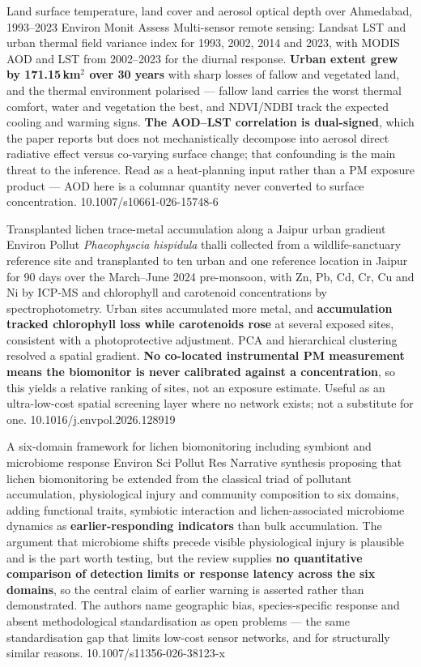 \documentclass[10pt]{article}
\begin{document}
{Land surface temperature, land cover and aerosol optical depth over Ahmedabad, 1993--2023}
{Environ Monit Assess}
{Multi-sensor remote sensing: Landsat LST and urban thermal field variance index for 1993,
2002, 2014 and 2023, with MODIS AOD and LST from 2002--2023 for the diurnal response.
\textbf{Urban extent grew by 171.15\,km$^2$ over 30 years} with sharp losses of fallow and
vegetated land, and the thermal environment polarised --- fallow land carries the worst
thermal comfort, water and vegetation the best, and NDVI/NDBI track the expected cooling
and warming signs. \textbf{The AOD--LST correlation is dual-signed}, which the paper
reports but does not mechanistically decompose into aerosol direct radiative effect versus
co-varying surface change; that confounding is the main threat to the inference. Read as
a heat-planning input rather than a PM exposure product --- AOD here is a columnar
quantity never converted to surface concentration.}
{10.1007/s10661-026-15748-6}

{Transplanted lichen trace-metal accumulation along a Jaipur urban gradient}
{Environ Pollut}
{\textit{Phaeophyscia hispidula} thalli collected from a wildlife-sanctuary reference site
and transplanted to ten urban and one reference location in Jaipur for 90 days over the
March--June 2024 pre-monsoon, with Zn, Pb, Cd, Cr, Cu and Ni by ICP-MS and chlorophyll and
carotenoid concentrations by spectrophotometry. Urban sites accumulated more metal, and
\textbf{accumulation tracked chlorophyll loss while carotenoids rose} at several exposed
sites, consistent with a photoprotective adjustment. PCA and hierarchical clustering
resolved a spatial gradient. \textbf{No co-located instrumental PM measurement means the
biomonitor is never calibrated against a concentration}, so this yields a relative ranking
of sites, not an exposure estimate. Useful as an ultra-low-cost spatial screening layer
where no network exists; not a substitute for one.}
{10.1016/j.envpol.2026.128919}

{A six-domain framework for lichen biomonitoring including symbiont and microbiome response}
{Environ Sci Pollut Res}
{Narrative synthesis proposing that lichen biomonitoring be extended from the classical
triad of pollutant accumulation, physiological injury and community composition to six
domains, adding functional traits, symbiotic interaction and lichen-associated microbiome
dynamics as \textbf{earlier-responding indicators} than bulk accumulation. The argument
that microbiome shifts precede visible physiological injury is plausible and is the part
worth testing, but the review supplies \textbf{no quantitative comparison of detection
limits or response latency across the six domains}, so the central claim of earlier warning
is asserted rather than demonstrated. The authors name geographic bias, species-specific
response and absent methodological standardisation as open problems --- the same
standardisation gap that limits low-cost sensor networks, and for structurally similar
reasons.}
{10.1007/s11356-026-38123-x}
\end{document}
